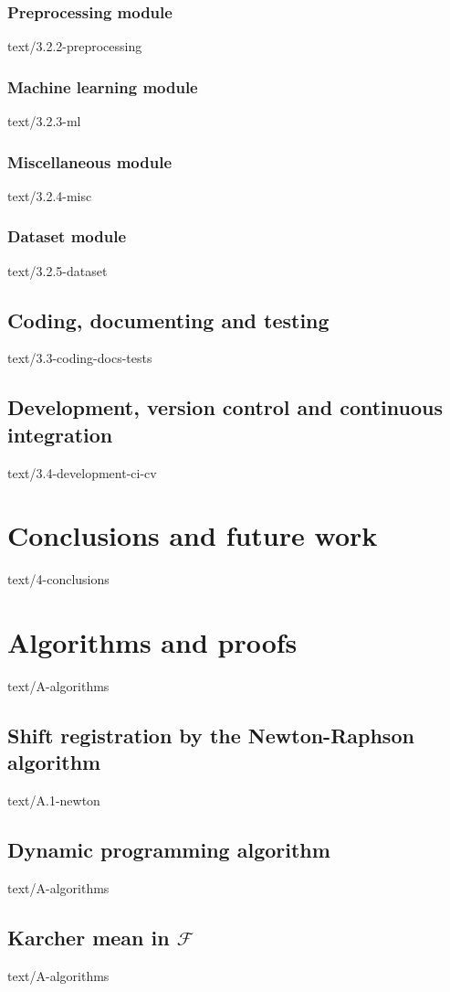 \documentclass[epsbased,copyleft,final,loe, lof,extendedindex,firstnumbered,tfg,english]{tfgtfmthesisuam}
\begin{document}
  \subsection{Preprocessing module\label{SEC:PREPMOD}}{text/3.2.2-preprocessing}
  \subsection{Machine learning module\label{SEC:MLMOD}}{text/3.2.3-ml}
  \subsection{Miscellaneous module\label{SEC:MISCMOD}}{text/3.2.4-misc}
  \subsection{Dataset module\label{SEC:DATAMOD}}{text/3.2.5-dataset}
\section{Coding, documenting and testing\label{SEC:CODING}}{text/3.3-coding-docs-tests}
\section{Development, version control and continuous integration\label{SEC:DEVELOPMENT}}{text/3.4-development-ci-cv}

\chapter{Conclusions and future work\label{CAP:CONCLUSIONS}}{text/4-conclusions}

\appendix

\chapter{Algorithms and proofs\label{CAP:ALGORITHMS}}{text/A-algorithms}
  \section{Shift registration by the Newton-Raphson algorithm\label{SEC:NEWTON}}{text/A.1-newton}
  \section{Dynamic programming algorithm\label{SEC:DPA}}{text/A-algorithms}
  \section{Karcher mean in $\mathcal{F}$\label{SEC:KARCHERF}}{text/A-algorithms}
\end{document}
